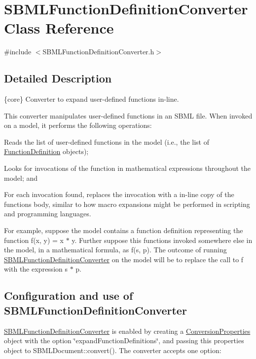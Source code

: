 \hypertarget{class_s_b_m_l_function_definition_converter}{}\section{S\+B\+M\+L\+Function\+Definition\+Converter Class Reference}
\label{class_s_b_m_l_function_definition_converter}


{\ttfamily \#include $<$S\+B\+M\+L\+Function\+Definition\+Converter.\+h$>$}



\subsection{Detailed Description}
\{core\} Converter to expand user-\/defined functions in-\/line.



This converter manipulates user-\/defined functions in an S\+B\+ML file. When invoked on a model, it performs the following operations\+:

\begin{DoxyItemize}
\item Reads the list of user-\/defined functions in the model (i.\+e., the list of \hyperlink{class_function_definition}{Function\+Definition} objects); \item Looks for invocations of the function in mathematical expressions throughout the model; and \item For each invocation found, replaces the invocation with a in-\/line copy of the function\textquotesingle{}s body, similar to how macro expansions might be performed in scripting and programming languages.\end{DoxyItemize}
For example, suppose the model contains a function definition representing the function {\ttfamily f(x, y) = x $\ast$ y}. Further suppose this functions invoked somewhere else in the model, in a mathematical formula, as {\ttfamily f(s, p)}. The outcome of running \hyperlink{class_s_b_m_l_function_definition_converter}{S\+B\+M\+L\+Function\+Definition\+Converter} on the model will be to replace the call to {\ttfamily f} with the expression {\ttfamily s $\ast$ p}.\hypertarget{class_s_b_m_l_function_definition_converter_usage}{}\subsection{Configuration and use of S\+B\+M\+L\+Function\+Definition\+Converter}\label{class_s_b_m_l_function_definition_converter_usage}
\hyperlink{class_s_b_m_l_function_definition_converter}{S\+B\+M\+L\+Function\+Definition\+Converter} is enabled by creating a \hyperlink{class_conversion_properties}{Conversion\+Properties} object with the option {\ttfamily \char`\"{}expand\+Function\+Definitions\char`\"{}}, and passing this properties object to S\+B\+M\+L\+Document\+::convert(). The converter accepts one option\+:

